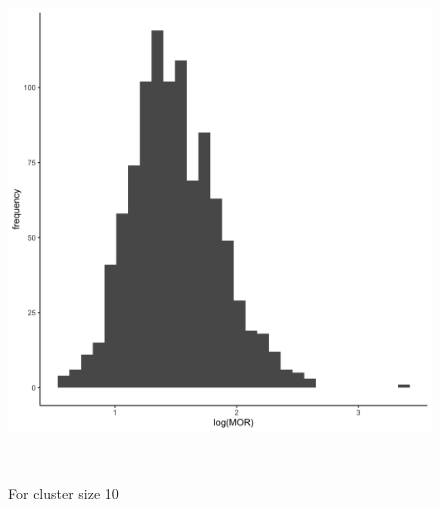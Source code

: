 \documentclass[
  letterpaper,
  DIV=11,
  numbers=noendperiod,
  titlepage]{scrartcl}
\begin{document}
\begin{figure}
\begin{minipage}[t]{0.50\linewidth}
{{\includegraphics{../../plots/two-lvl-ran-int/low-prev/hist_30_10_two_lvl_low_prev.png}

}

\caption{For cluster size 10}

}

\end{minipage}%
\newline
\begin{minipage}[t]{\linewidth}

{\centering 

~

}

\end{minipage}%
\newline
\begin{minipage}[t]{0.50\linewidth}

{\centering 

\raisebox{-\height}{

}}
\end{minipage}
\end{figure}
\end{document}
